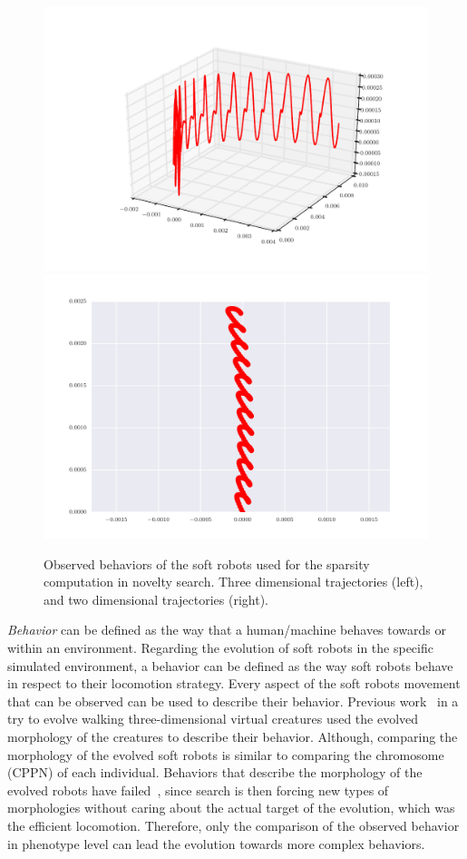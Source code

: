 \documentclass{sig-alternate}
\begin{document}
\begin{figure}[t!]
\centering
\includegraphics[scale=0.19]{../Figures/Behaviors/3d.pdf}\includegraphics[scale=0.18]{../Figures/Behaviors/2d.pdf}
\caption{Observed behaviors of the soft robots used for the sparsity computation in novelty search. Three dimensional trajectories (left), and two dimensional trajectories (right).}
\label{fig:Behaviors}
\end{figure}

\emph{Behavior} can be defined as the way that a human/machine behaves towards or within an environment. Regarding the evolution of soft robots in the specific simulated environment, a behavior can be defined as the way soft robots behave in respect to their locomotion strategy. Every aspect of the soft robots movement that can be observed can be used to describe their behavior. Previous work~\cite{lehman2011evolving} in a try to evolve walking three-dimensional virtual creatures used the evolved morphology of the creatures to describe their behavior. Although, comparing the morphology of the evolved soft robots is similar to comparing the chromosome (CPPN) of each individual. Behaviors that describe the morphology of the evolved robots have failed~\cite{lehman2011evolving}, since search is then forcing new types of morphologies without caring about the actual target of the evolution, which was the efficient locomotion. Therefore, only the comparison of the observed behavior in phenotype level can lead the evolution towards more complex behaviors. 
\end{document}
